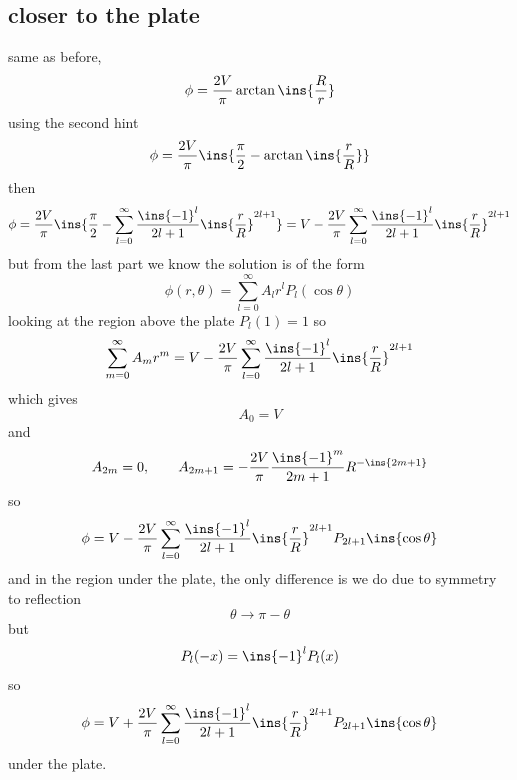 \subsection{closer to the plate}
same as before,
\begin{equation}
	\phi = \frac{2V}{\pi}\arctan\ins{\frac{R}{r}}
\end{equation}
using the second hint 
\begin{equation}
	\phi = \frac{2V}{\pi}\ins{\frac{\pi}{2}-\arctan\ins{\frac{r}{R}}}
\end{equation}
then
\begin{equation}
	\phi = \frac{2V}{\pi}\ins{\frac{\pi}{2}-\sum_{l=0}^{\infty}\frac{\ins{-1}^l}{2l+1}\ins{\frac{r}{R}}^{2l+1}}=V-\frac{2V}{\pi}\sum_{l=0}^{\infty}\frac{\ins{-1}^l}{2l+1}\ins{\frac{r}{R}}^{2l+1}
\end{equation}
but from the last part we know the solution is of the form 
\begin{equation}
	\phi(r,\theta) = \sum_{l=0}^{\infty}A_l r^l P_l(\cos\theta)
\end{equation}
looking at the region above the plate \(P_l(1)=1\) so 
\begin{equation}
	\sum_{m=0}^{\infty}A_m r^m = V-\frac{2V}{\pi}\sum_{l=0}^{\infty}\frac{\ins{-1}^l}{2l+1}\ins{\frac{r}{R}}^{2l+1}
\end{equation}
which gives 
\begin{equation}
	A_0=V
\end{equation}
and
\begin{equation}
	A_{2m}=0,\qquad A_{2m+1}=-\frac{2V}{\pi}\frac{\ins{-1}^m}{2m+1}R^{-\ins{2m+1}}
\end{equation}
so 
\begin{equation}
	\phi = V-\frac{2V}{\pi}\sum_{l=0}^{\infty}\frac{\ins{-1}^l}{2l+1}\ins{\frac{r}{R}}^{2l+1}P_{2l+1}\ins{\cos\theta}
\end{equation}
and in the region under the plate, the only difference is we do due to symmetry to reflection
\begin{equation}
	\theta\rightarrow\pi-\theta
\end{equation}
but 
\begin{equation}
	P_l(-x)=\ins{-1}^l P_l(x)
\end{equation}
so
\begin{equation}
	\phi = V+\frac{2V}{\pi}\sum_{l=0}^{\infty}\frac{\ins{-1}^l}{2l+1}\ins{\frac{r}{R}}^{2l+1}P_{2l+1}\ins{\cos\theta}
\end{equation}
under the plate.
